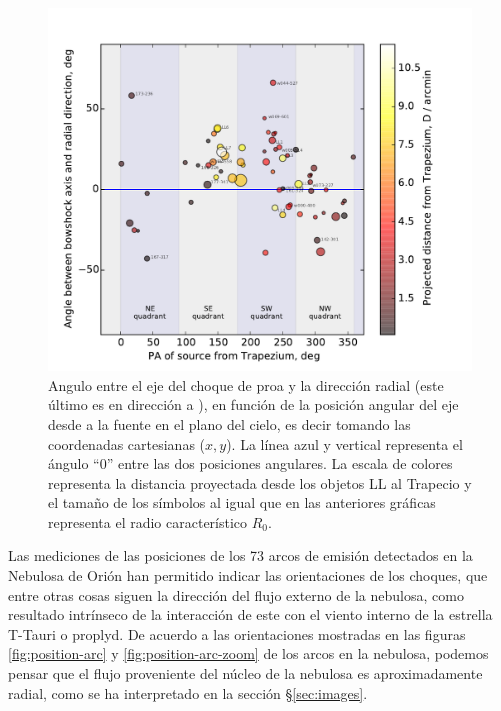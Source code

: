 \begin{figure}
  \centering
  \includegraphics[width=\linewidth, clip]{luis-programas/will-PA-vs-PA}
  \caption{Angulo entre el eje del choque de proa y la dirección radial (este último es en dirección a \thC{}), en función de la posición angular del eje desde \thC{} a la fuente en el plano del cielo, es decir tomando las coordenadas cartesianas (\(x, y\)). La línea azul y vertical representa el ángulo ``0'' entre las dos posiciones angulares. La escala de colores representa la distancia proyectada desde los objetos LL al Trapecio y el tamaño de los símbolos al igual que en las anteriores gráficas representa el radio característico \(R_{0}\).}
 \label{fig:pos-angular}
\end{figure}

Las mediciones de las posiciones de los 73 arcos de emisión detectados en la Nebulosa de Orión han permitido indicar las orientaciones de los choques, que entre otras cosas siguen la dirección del flujo externo de la nebulosa, como resultado intrínseco de la interacción de este con el viento interno de la estrella T-Tauri o proplyd. De acuerdo a las orientaciones mostradas en las figuras \ref{fig:position-arc} y \ref{fig:position-arc-zoom} de los arcos en la nebulosa, podemos pensar que el flujo proveniente del núcleo de la nebulosa es aproximadamente radial, como se ha interpretado en la sección \S\ref{sec:images}.\\

